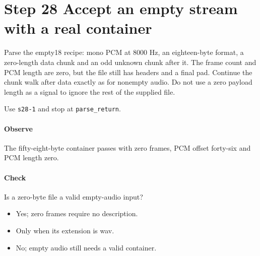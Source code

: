 \section{Step 28 Accept an empty stream with a real container}\label{pcm-wav-s28}
Parse the empty18 recipe: mono PCM at 8000 Hz, an eighteen-byte format, a zero-length data chunk and an odd unknown chunk after it. The frame count and PCM length are zero, but the file still has headers and a final pad. Continue the chunk walk after data exactly as for nonempty audio. Do not use a zero payload length as a signal to ignore the rest of the supplied file.

Use \texttt{s28-1} and stop at \texttt{parse\_return}.

\paragraph{Observe} The fifty-eight-byte container passes with zero frames, PCM offset forty-six and PCM length zero.

\paragraph{Check} Is a zero-byte file a valid empty-audio input?
\begin{itemize}
  \item[A.] Yes; zero frames require no description.
  \item[B.] Only when its extension is wav.
  \item[C.] No; empty audio still needs a valid container.
\end{itemize}
